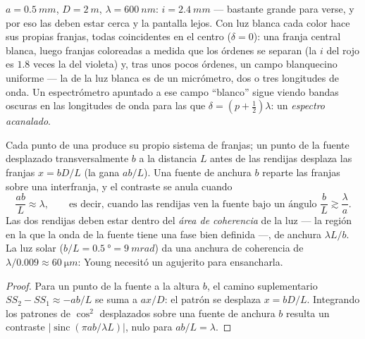 \begin{example}\label{ex:b2:two-wave-interference:numbers}
$a = \qty{0.5}{mm}$, $D = \qty{2}{m}$, $\lambda = \qty{600}{nm}$: $i = \qty{2.4}{mm}$ --- bastante
grande para verse, y por eso las  deben estar cerca y la pantalla
lejos. Con luz blanca cada color hace sus propias franjas, todas
coincidentes en el centro ($\delta = 0$): una franja central blanca, luego
franjas coloreadas a medida que los órdenes se separan (la $i$ del rojo es $1.8$ veces la del
violeta) y, tras unos pocos órdenes, un campo blanquecino uniforme --- la
 de la luz blanca es de un micrómetro, dos o tres
longitudes de onda. Un espectrómetro apuntado a ese campo ``blanco'' sigue viendo
bandas oscuras en las longitudes de onda para las que $\delta = (p + \tfrac12)\lambda$: un
\emph{espectro acanalado}.
\end{example}

\begin{proposition}\label{prop:b2:two-wave-interference:spatial}
Cada punto de una  produce su propio sistema de franjas; un
punto de la fuente desplazado transversalmente $b$ a la distancia $L$ antes
de las rendijas desplaza las franjas $x = bD/L$ (la  gana
$ab/L$). Una fuente de anchura $b$ reparte las franjas sobre una interfranja,
y el contraste se anula cuando
\[
\frac{ab}L \approx \lambda , \qquad\text{es decir, cuando las rendijas ven la fuente bajo un ángulo } \frac bL \gtrsim \frac\lambda a .
\]
Las dos rendijas deben estar dentro del \emph{área de coherencia} de la luz ---
la región en la que la onda de la fuente tiene una fase bien definida ---,
de anchura $\lambda L/b$. La luz solar ($b/L = \qty{0.5}{\degree} = \qty{9}{mrad}$)
da una anchura de coherencia de $\lambda/0.009 \approx \qty{60}{\micro m}$: Young necesitó un
agujerito para ensancharla.
\end{proposition}

\begin{proof}
Para un punto de la fuente a la altura $b$, el camino suplementario $SS_2 - SS_1 \approx -ab/L$
se suma a $ax/D$: el patrón se desplaza $x = bD/L$. Integrando los
patrones de $\cos^2$ desplazados sobre una fuente de anchura $b$ resulta un contraste
$|\operatorname{sinc}(\pi ab/\lambda L)|$, nulo para $ab/L = \lambda$.
\end{proof}

